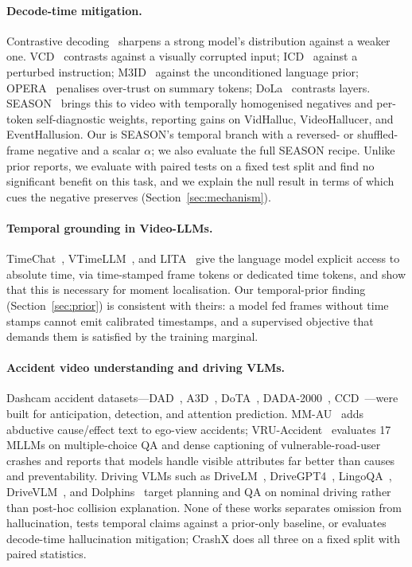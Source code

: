 \paragraph{Decode-time mitigation.}
Contrastive decoding~\cite{li2023cd} sharpens a strong model's distribution against a weaker one.
VCD~\cite{vcd} contrasts against a visually corrupted input; ICD~\cite{icd} against a perturbed instruction; M3ID~\cite{m3id} against the unconditioned language prior; OPERA~\cite{opera} penalises over-trust on summary tokens; DoLa~\cite{dola} contrasts layers.
SEASON~\cite{season2025} brings this to video with temporally homogenised negatives and per-token self-diagnostic weights, reporting gains on VidHalluc, VideoHallucer, and EventHallusion.
Our \tcd{} is SEASON's temporal branch with a reversed- or shuffled-frame negative and a scalar $\alpha$; we also evaluate the full SEASON recipe.
Unlike prior reports, we evaluate with paired tests on a fixed test split and find no significant benefit on this task, and we explain the null result in terms of which cues the negative preserves (Section~\ref{sec:mechanism}).

\paragraph{Temporal grounding in Video-LLMs.}
TimeChat~\cite{timechat}, VTimeLLM~\cite{vtimellm}, and LITA~\cite{lita} give the language model explicit access to absolute time, via time-stamped frame tokens or dedicated time tokens, and show that this is necessary for moment localisation.
Our temporal-prior finding (Section~\ref{sec:prior}) is consistent with theirs: a model fed frames without time stamps cannot emit calibrated timestamps, and a supervised objective that demands them is satisfied by the training marginal.

\paragraph{Accident video understanding and driving VLMs.}
Dashcam accident datasets---DAD~\cite{chan2016dad}, A3D~\cite{yao2019a3d}, DoTA~\cite{yao2022dota}, DADA-2000~\cite{fang2021dada}, CCD~\cite{bao2020nondeterministic}---were built for anticipation, detection, and attention prediction.
MM-AU~\cite{fang2024mmau} adds abductive cause/effect text to ego-view accidents; VRU-Accident~\cite{vruaccident} evaluates 17 MLLMs on multiple-choice QA and dense captioning of vulnerable-road-user crashes and reports that models handle visible attributes far better than causes and preventability.
Driving VLMs such as DriveLM~\cite{drivelm}, DriveGPT4~\cite{drivegpt4}, LingoQA~\cite{lingoqa}, DriveVLM~\cite{drivevlm}, and Dolphins~\cite{dolphins} target planning and QA on nominal driving rather than post-hoc collision explanation.
None of these works separates omission from hallucination, tests temporal claims against a prior-only baseline, or evaluates decode-time hallucination mitigation; CrashX does all three on a fixed split with paired statistics.

